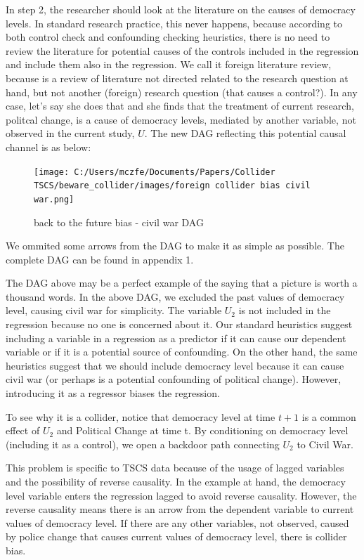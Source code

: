 \documentclass[
  super,
  preprint,
  3p]{elsarticle}
\begin{document}
In step 2, the researcher should look at the literature on the causes of
democracy levels. In standard research practice, this never happens,
because according to both control check and confounding checking
heuristics, there is no need to review the literature for potential
causes of the controls included in the regression and include them also
in the regression. We call it foreign literature review, because is a
review of literature not directed related to the research question at
hand, but not another (foreign) research question (that causes a
control?). In any case, let's say she does that and she finds that the
treatment of current research, politcal change, is a cause of democracy
levels, mediated by another variable, not observed in the current study,
\(U\). The new DAG reflecting this potential causal channel is as below:

\begin{figure}

{\centering \texttt{[image: C:/Users/mczfe/Documents/Papers/Collider TSCS/beware\_collider/images/foreign collider bias civil war.png]}

}

\caption{back to the future bias - civil war DAG}

\end{figure}

We ommited some arrows from the DAG to make it as simple as possible.
The complete DAG can be found in appendix 1.

The DAG above may be a perfect example of the saying that a picture is
worth a thousand words. In the above DAG, we excluded the past values of
democracy level, causing civil war for simplicity. The variable \(U_2\)
is not included in the regression because no one is concerned about it.
Our standard heuristics suggest including a variable in a regression as
a predictor if it can cause our dependent variable or if it is a
potential source of confounding. On the other hand, the same heuristics
suggest that we should include democracy level because it can cause
civil war (or perhaps is a potential confounding of political change).
However, introducing it as a regressor biases the regression.

To see why it is a collider, notice that democracy level at time \(t+1\)
is a common effect of \(U_2\) and Political Change at time t. By
conditioning on democracy level (including it as a control), we open a
backdoor path connecting \(U_2\) to Civil War.

This problem is specific to TSCS data because of the usage of lagged
variables and the possibility of reverse causality. In the example at
hand, the democracy level variable enters the regression lagged to avoid
reverse causality. However, the reverse causality means there is an
arrow from the dependent variable to current values of democracy level.
If there are any other variables, not observed, caused by police change
that causes current values of democracy level, there is collider bias.
\end{document}
